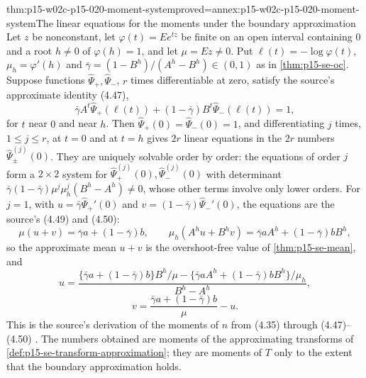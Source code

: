 \begin{hbtheorem}{thm:p15-w02c-p15-020-moment-system}{proved=annex:p15-w02c-p15-020-moment-system}{The linear equations for the moments under the boundary approximation}
Let \(z\) be nonconstant, let \(\varphi(t)=Ee^{tz}\) be finite on an
open interval containing \(0\) and a root \(h\neq0\) of
\(\varphi(h)=1\), and let \(\mu=Ez\neq0\). Put
\(\ell(t)=-\log\varphi(t)\), \(\mu_h=\varphi'(h)\) and
\(\bar\gamma=(1-B^h)/(A^h-B^h)\in(0,1)\) as in \cref{thm:p15-se-oc}.
Suppose functions \(\widehat\Psi_+,\widehat\Psi_-\), \(r\) times
differentiable at zero, satisfy the source's approximate identity
(4.47),
\[
 \bar\gamma A^t\widehat\Psi_+(\ell(t))+(1-\bar\gamma)B^t\widehat\Psi_-(\ell(t))=1,
\]
for \(t\) near \(0\) and near \(h\). Then
\(\widehat\Psi_+(0)=\widehat\Psi_-(0)=1\), and differentiating \(j\)
times, \(1\leq j\leq r\), at \(t=0\) and at \(t=h\) gives \(2r\) linear
equations in the \(2r\) numbers \(\widehat\Psi_\pm^{(j)}(0)\). They are
uniquely solvable order by order: the equations of order \(j\) form a
\(2\times2\) system for \(\widehat\Psi_+^{(j)}(0),\widehat\Psi_-^{(j)}(0)\)
with determinant
\(\bar\gamma(1-\bar\gamma)\mu^j\mu_h^j(B^h-A^h)\neq0\), whose other
terms involve only lower orders. For \(j=1\), with
\(u=\bar\gamma\widehat\Psi_+'(0)\) and \(v=(1-\bar\gamma)\widehat\Psi_-'(0)\),
the equations are the source's (4.49) and (4.50):
\[
 \mu(u+v)=\bar\gamma a+(1-\bar\gamma)b,\qquad
 \mu_h(A^hu+B^hv)=\bar\gamma aA^h+(1-\bar\gamma)bB^h,
\]
so the approximate mean \(u+v\) is the overshoot-free value of
\cref{thm:p15-se-mean}, and
\[
 u=\frac{\{\bar\gamma a+(1-\bar\gamma)b\}B^h/\mu
   -\{\bar\gamma aA^h+(1-\bar\gamma)bB^h\}/\mu_h}{B^h-A^h},
\]
\[
 v=\frac{\bar\gamma a+(1-\bar\gamma)b}{\mu}-u .
\]
This is the source's derivation of the moments of \(n\) from (4.35)
through (4.47)--(4.50)
\cite[Section 4.4, pp.~149--150]{Wald1945SequentialTests}. The numbers
obtained are moments of the approximating transforms of
\cref{def:p15-se-transform-approximation}; they are moments of \(T\)
only to the extent that the boundary approximation holds.
\end{hbtheorem}

